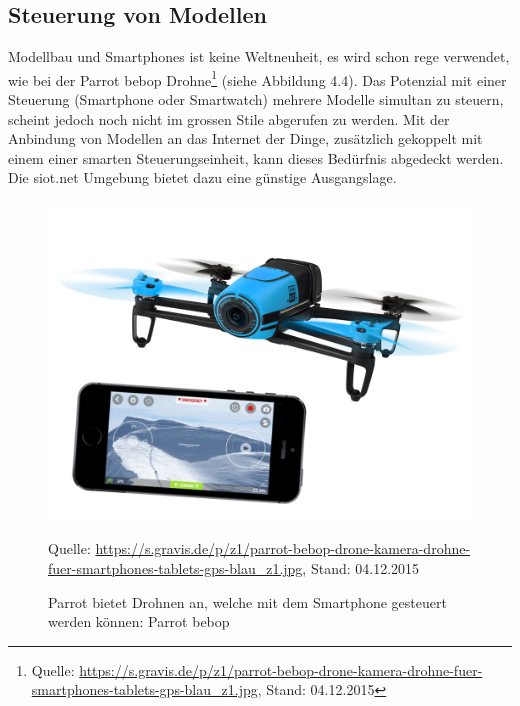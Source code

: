 \subsection{Steuerung von Modellen}
Modellbau und Smartphones ist keine Weltneuheit, es wird schon rege verwendet, wie bei der Parrot bebop Drohne\footnote{Quelle: \url{https://s.gravis.de/p/z1/parrot-bebop-drone-kamera-drohne-fuer-smartphones-tablets-gps-blau_z1.jpg}, Stand: 04.12.2015 } (siehe Abbildung 4.4). Das Potenzial mit einer Steuerung (Smartphone oder Smartwatch) mehrere Modelle simultan zu steuern, scheint jedoch noch nicht im grossen Stile abgerufen zu werden.
Mit der Anbindung von Modellen an das Internet der Dinge, zusätzlich gekoppelt mit einem einer smarten Steuerungseinheit, kann dieses Bedürfnis abgedeckt werden. Die siot.net Umgebung bietet dazu eine günstige Ausgangslage.
\begin{figure}[h]
  \centering
  \includegraphics[scale=1]{98_Bilder/04_Anwendungen/parrotdrone}
  \caption[Smartphone gesteuerte Drohne: Parrot bebop]{Parrot bietet Drohnen an, welche mit dem Smartphone gesteuert werden können: Parrot bebop}
  \footnotesize Quelle: \url{https://s.gravis.de/p/z1/parrot-bebop-drone-kamera-drohne-fuer-smartphones-tablets-gps-blau_z1.jpg}, Stand: 04.12.2015
\end{figure}
